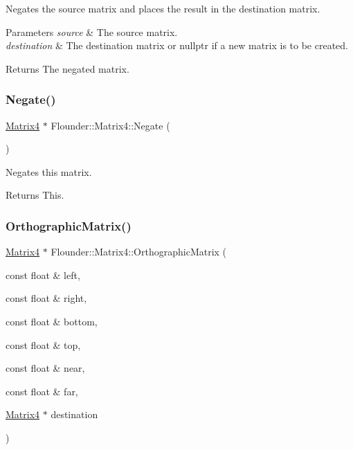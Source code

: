 Negates the source matrix and places the result in the destination matrix. 


\begin{DoxyParams}{Parameters}
{\em source} & The source matrix. \\
\hline
{\em destination} & The destination matrix or nullptr if a new matrix is to be created. \\
\hline
\end{DoxyParams}
\begin{DoxyReturn}{Returns}
The negated matrix. 
\end{DoxyReturn}
\mbox{\label{class_flounder_1_1_matrix4_ac6cc46cd2070c9d224f092dba27a8828}} 
\subsubsection{\texorpdfstring{Negate()}{Negate()}\hspace{0.1cm}{\footnotesize\ttfamily [2/2]}}
{\footnotesize\ttfamily \hyperlink{class_flounder_1_1_matrix4}{Matrix4} $\ast$ Flounder\+::\+Matrix4\+::\+Negate (\begin{DoxyParamCaption}{ }\end{DoxyParamCaption})}



Negates this matrix. 

\begin{DoxyReturn}{Returns}
This. 
\end{DoxyReturn}
\mbox{\label{class_flounder_1_1_matrix4_ae164bc0e40f09945ebc2a24b01bb91ec}} 
\subsubsection{\texorpdfstring{Orthographic\+Matrix()}{OrthographicMatrix()}}
{\footnotesize\ttfamily \hyperlink{class_flounder_1_1_matrix4}{Matrix4} $\ast$ Flounder\+::\+Matrix4\+::\+Orthographic\+Matrix (\begin{DoxyParamCaption}\item[{const float \&}]{left,  }\item[{const float \&}]{right,  }\item[{const float \&}]{bottom,  }\item[{const float \&}]{top,  }\item[{const float \&}]{near,  }\item[{const float \&}]{far,  }\item[{\hyperlink{class_flounder_1_1_matrix4}{Matrix4} $\ast$}]{destination }\end{DoxyParamCaption})\hspace{0.3cm}{\ttfamily [static]}}



